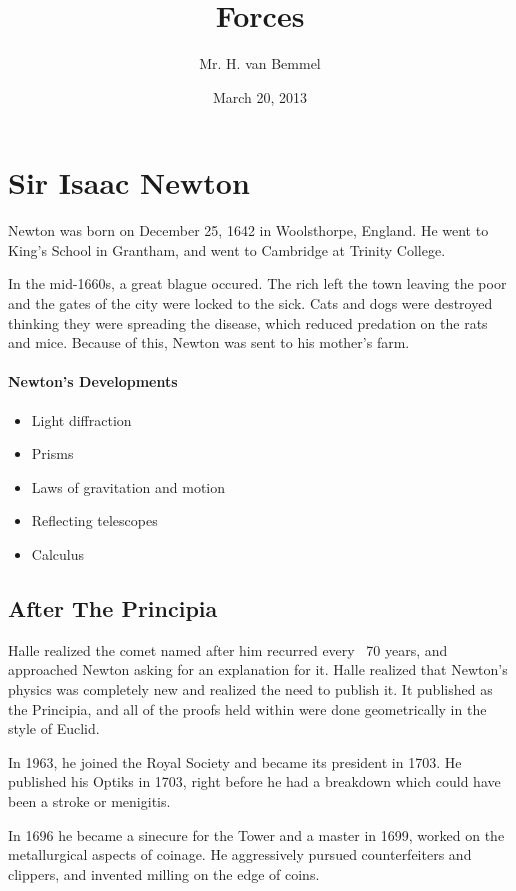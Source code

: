 \documentclass[letterpaper, 12pt]{article}
\begin{document}
\title{Forces}
\author{Mr. H. van Bemmel}
\date{March 20, 2013}
\maketitle


\section{Sir Isaac Newton}
Newton was born on December 25, 1642 in Woolsthorpe, England. He went to King's School
in Grantham, and went to Cambridge at Trinity College.

In the mid-1660s, a great blague occured. The rich left the town leaving the
poor and the gates of the city were locked to the sick. Cats and dogs were destroyed
thinking they were spreading the disease, which reduced predation on the rats and mice.
Because of this, Newton was sent to his mother's farm.
\paragraph*{Newton's Developments}
\begin{itemize}
    \item Light diffraction
    \item Prisms
    \item Laws of gravitation and motion
    \item Reflecting telescopes
    \item Calculus
\end{itemize}
\subsection{After The Principia}
Halle realized the comet named after him recurred every ~70 years, and approached
Newton asking for an explanation for it. Halle realized that Newton's physics
was completely new and realized the need to publish it. It published as
the Principia, and all of the proofs held within were done geometrically
in the style of Euclid.

In 1963, he joined the Royal Society and became its president in 1703.
He published his Optiks in 1703, right before he had a breakdown which could
have been a stroke or menigitis.

In 1696 he became a sinecure for the Tower and a master in 1699, worked on the
metallurgical aspects of coinage. He aggressively pursued counterfeiters
and clippers, and invented milling on the edge of coins.
\end{document}
